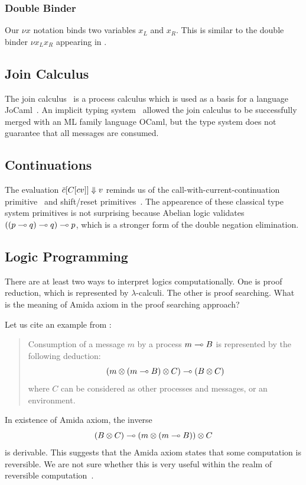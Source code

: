 \subsubsection{Double Binder}
 Our $\nu x$ notation binds two variables $x_L$ and $x_R$.
 This is similar to the double binder $\nu x_L x_R$ appearing in
 \citet{gay2010}.

 \subsection{Join Calculus}

 The join calculus~\citep{join} is a process calculus which is used as a basis for a
 language JoCaml~\citep{fournet2002jocaml}.
 An implicit typing system~\citep{fournet1997} allowed the join calculus
 to be successfully merged with an ML family language OCaml, but the
 type system does not guarantee that all messages are consumed.

 \subsection{Continuations}
 The evaluation $\bar{c}[C[cv]]\Downarrow v$ reminds us of the call-with-current-continuation
 primitive~\citep{rees1986} and shift/reset primitives~\citep{danvy1990,asai2007}.
 The appearence of these classical type system primitives is not
 surprising because Abelian logic validates $((p\multimap q)\multimap q)\multimap p$,
 which is a stronger form of the double negation elimination.

 \subsection{Logic Programming}

 There are at least two ways to interpret logics computationally.
 One is proof reduction, which is represented by $\lambda$-calculi.
 The other is proof searching.  What is the meaning of Amida axiom in
 the proof searching approach?

 Let us cite an example from \citet[A.2]{kobayashi-yonezawa}:
 \begin{quote}
  Consumption of a message $m$ by a process $m\multimap B$ is represented by
  the following deduction:
  \[
   (m\otimes(m\multimap B)\otimes C)\multimap (B\otimes C)
  \]
  where $C$ can be considered as other processes and messages, or an environment.
 \end{quote}
 In existence of Amida axiom,
 the inverse
 \[
  (B\otimes C)\multimap (m\otimes (m\multimap B))\otimes C
 \]
 is derivable.
 This suggests that the Amida axiom states that some
 computation is reversible.  We are not sure whether this is very
 useful within the realm of reversible computation~\citep{revcon}.

